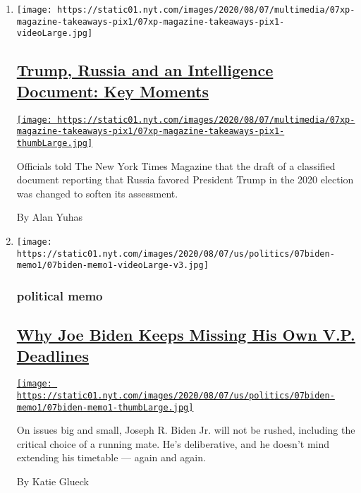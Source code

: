 \begin{enumerate}
\def\labelenumi{\arabic{enumi}.}
\item
  \texttt{[image: https://static01.nyt.com/images/2020/08/07/multimedia/07xp-magazine-takeaways-pix1/07xp-magazine-takeaways-pix1-videoLarge.jpg]}

  \hypertarget{trump-russia-and-an-intelligence-document-key-moments}{%
  \subsection{\texorpdfstring{\href{/2020/08/08/us/politics/trump-russia.html}{Trump,
  Russia and an Intelligence Document: Key
  Moments}}{Trump, Russia and an Intelligence Document: Key Moments}}\label{trump-russia-and-an-intelligence-document-key-moments}}

  \href{/2020/08/08/us/politics/trump-russia.html}{\texttt{[image: https://static01.nyt.com/images/2020/08/07/multimedia/07xp-magazine-takeaways-pix1/07xp-magazine-takeaways-pix1-thumbLarge.jpg]}}

  Officials told The New York Times Magazine that the draft of a
  classified document reporting that Russia favored President Trump in
  the 2020 election was changed to soften its assessment.

  By Alan Yuhas
\item
  \texttt{[image: https://static01.nyt.com/images/2020/08/07/us/politics/07biden-memo1/07biden-memo1-videoLarge-v3.jpg]}

  \hypertarget{political-memo}{%
  \subsubsection{political memo}\label{political-memo}}

  \hypertarget{why-joe-biden-keeps-missing-his-own-vp-deadlines}{%
  \subsection{\texorpdfstring{\href{/2020/08/07/us/politics/joe-biden-vice-presidential-search.html}{Why
  Joe Biden Keeps Missing His Own V.P.
  Deadlines}}{Why Joe Biden Keeps Missing His Own V.P. Deadlines}}\label{why-joe-biden-keeps-missing-his-own-vp-deadlines}}

  \href{/2020/08/07/us/politics/joe-biden-vice-presidential-search.html}{\texttt{[image: https://static01.nyt.com/images/2020/08/07/us/politics/07biden-memo1/07biden-memo1-thumbLarge.jpg]}}

  On issues big and small, Joseph R. Biden Jr. will not be rushed,
  including the critical choice of a running mate. He's deliberative,
  and he doesn't mind extending his timetable --- again and again.

  By Katie Glueck
\end{enumerate}

